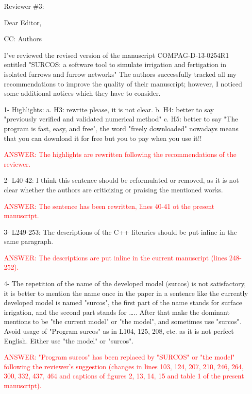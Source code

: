 \documentclass[a4paper]{article}
\begin{document}
\vspace{5mm}

Reviewer \#3: 

Dear Editor,

CC: Authors

I've reviewed the revised version of the manuscript COMPAG-D-13-0254R1 entitled "SURCOS: a software tool to simulate irrigation and fertigation in isolated furrows and furrow networks"
The authors successfully tracked all my recommendations to improve the quality of their manuscript; however, I noticed some additional notices which they have to consider.

1-	Highlights:
a.	H3: rewrite please, it is not clear.
b.	H4: better to say "previously verified and validated numerical method"
c.	H5: better to say "The program is fast, easy, and free", the word "freely downloaded" nowadays means that you can download it for free but you to pay when you use it!!

\textcolor{red}{ANSWER: The highlights are rewritten following the recommendations of the reviewer.}

2-	L40-42: I think this sentence should be reformulated or removed, as it is not clear whether the authors are criticizing or praising the mentioned works.

\textcolor{red}{ANSWER: The sentence has been rewritten, lines 40-41 ot the present manuscript.}

3-	L249-253: The descriptions of the C++ libraries should be put inline in the same paragraph.

\textcolor{red}{ANSWER: The descriptions are put inline in the current manuscript (lines 248-252).}

4-	The repetition of the name of the developed model (surcos) is not satisfactory, it is better to mention the name once in the paper in a sentence like {the currently developed model is named "surcos", the first part of the name stands for surface irrigation, and the second part stands for ….}. After that make the dominant mentions to be "the current model" or "the model", and sometimes use "surcos". Avoid usage of "Program surcos" as in L104, 125, 208, etc. as it is not perfect English. Either use "the model" or "surcos". 

\textcolor{red}{ANSWER: "Program surcos" has been replaced by "SURCOS" or "the model" following the reviewer's suggestion (changes in lines 103, 124, 207, 210, 246, 264, 300, 332, 437, 464 and captions of figures 2, 13, 14, 15 and table 1 of the present manuscript).}
\end{document}
